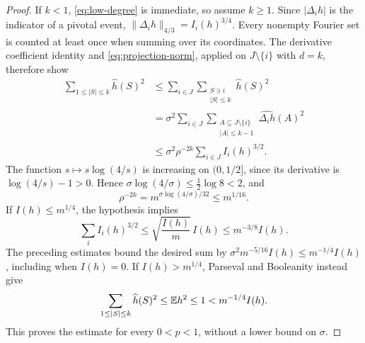 \begin{proof}
If $k<1$, \eqref{eq:low-degree} is immediate, so assume $k\ge1$.
Since $|\Delta_i h|$ is the indicator of a pivotal event,
$\|\Delta_i h\|_{4/3}=I_i(h)^{3/4}$. Every nonempty Fourier set is
counted at least once when summing over its coordinates. The derivative
coefficient identity and \eqref{eq:projection-norm}, applied on
$J\setminus\{i\}$ with $d=k$, therefore show
\begin{align*}
  \sum_{1\le |S|\le k}\widehat h(S)^2
  &\le\sum_{i\in J}\sum_{\substack{S\ni i\\|S|\le k}}
       \widehat h(S)^2\\
  &=\sigma^2\sum_{i\in J}
       \sum_{\substack{A\subseteq J\setminus\{i\}\\|A|\le k-1}}
       \widehat{\Delta_i h}(A)^2\\
  &\le\sigma^2\rho^{-2k}\sum_{i\in J}I_i(h)^{3/2}.
\end{align*}
The function $s\mapsto s\log(4/s)$ is increasing on $(0,1/2]$, since
its derivative is $\log(4/s)-1>0$. Hence
$\sigma\log(4/\sigma)\le\tfrac12\log8<2$, and
\[
  \rho^{-2k}
  =m^{\sigma\log(4/\sigma)/32}\le m^{1/16}.
\]
If $I(h)\le m^{1/4}$, the hypothesis implies
\[
  \sum_i I_i(h)^{3/2}
  \le\sqrt{\frac{I(h)}m}\,I(h)
  \le m^{-3/8}I(h).
\]
The preceding estimates bound the desired sum by
$\sigma^2m^{-5/16}I(h)\le m^{-1/4}I(h)$, including when $I(h)=0$.
If $I(h)>m^{1/4}$, Parseval and Booleanity instead give
\[
  \sum_{1\le |S|\le k}\widehat h(S)^2
  \le\mathbb E h^2\le1<m^{-1/4}I(h).
\]
This proves the estimate for every $0<p<1$, without a lower bound on
$\sigma$.
\end{proof}
